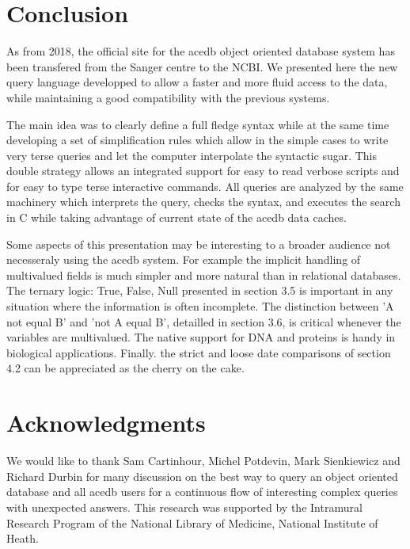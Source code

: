 \documentclass[11pt]{article}
\begin{document}
\section{Conclusion}

As from 2018, the official site for the acedb object oriented database system 
has been transfered from the Sanger centre to the NCBI.
We presented here the new
query language developped to allow 
a faster and more fluid access to the data,
while maintaining a good compatibility with the previous systems.

The main idea was to clearly define a full fledge syntax
while at the same time developing a set of simplification rules
which allow in the simple cases to write very terse queries
and let the computer interpolate the syntactic sugar.
This double strategy allows an integrated support
for easy to read verbose scripts and for
easy to type terse interactive commands. All queries
are analyzed by the same machinery which interprets the query,
checks the syntax, and executes the search in C
while taking advantage of current state of the acedb data caches.
 
Some aspects of this presentation may be interesting to a broader audience 
not necesseraly using the acedb system. For example the implicit handling of multivalued
fields is much simpler and more natural than in relational databases.
The ternary logic: True, False, Null presented 
in section 3.5 is important in any situation where the information is often incomplete. The distinction between
'A not equal B' and 'not A equal B', detailled in section 3.6, is critical whenever the variables are multivalued.
The native support for DNA and proteins is handy in biological applications. 
Finally. the strict and loose date comparisons of section 4.2 can be appreciated as the cherry on the cake.


\section*{Acknowledgments}

We would like to thank Sam Cartinhour, Michel Potdevin, Mark Sienkiewicz and Richard Durbin
for many discussion on the best way to query an object oriented database
and all acedb users for a continuous flow of interesting complex queries
with unexpected answers.
This research was supported by the Intramural Research Program of the National Library of Medicine, National Institute of Heath.
\end{document}
